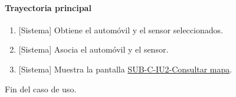 \paragraph{Trayectoria principal}
	\begin{enumerate}
		\item {[Sistema]} Obtiene el automóvil y el sensor seleccionados.
		\item {[Sistema]} Asocia el automóvil y el sensor.
		\item {[Sistema]} Muestra la pantalla \hyperref[fig:sub-c-iu2]{SUB-C-IU2-Consultar mapa}.
	\end{enumerate}
	Fin del caso de uso.

